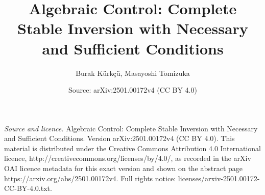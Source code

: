 \documentclass[10pt,a4paper]{amsart}
\theoremstyle{remark}
\begin{document}
\title[Complete stable inversion with necessary and sufficient conditions]{Algebraic Control: Complete Stable Inversion with Necessary and Sufficient Conditions}
\author{Burak K\"{u}rk\c{c}\"{u}, Masayoshi Tomizuka}
\date{Source: arXiv:2501.00172v4 (CC BY 4.0)}
\maketitle
\noindent\emph{Source and licence.} Algebraic Control: Complete Stable Inversion with Necessary and Sufficient Conditions. Version arXiv:2501.00172v4 (CC BY 4.0). This material is distributed under the Creative Commons Attribution 4.0 International licence, http://creativecommons.org/licenses/by/4.0/, as recorded in the arXiv OAI licence metadata for this exact version and shown on the abstract page https://arxiv.org/abs/2501.00172v4. Full rights notice: licenses/arxiv-2501.00172-CC-BY-4.0.txt.\par\smallskip
\end{document}
